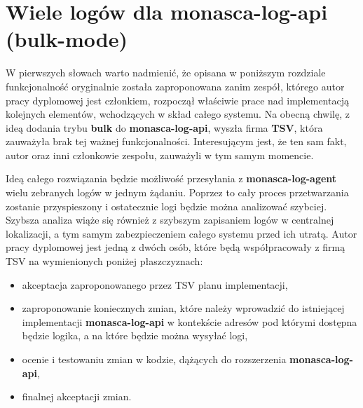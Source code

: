 \section{Wiele logów dla monasca-log-api (bulk-mode)}
\label{chapter:application_own:plans:bulk_monasca_log_api}

W pierwszych słowach warto nadmienić, że opisana w poniższym rozdziale funkcjonalność oryginalnie została 
zaproponowana zanim zespół, którego autor pracy dyplomowej jest członkiem, rozpoczął właściwie prace
nad implementacją kolejnych elementów, wchodzących w skład całego systemu. Na obecną chwilę, z ideą 
dodania trybu \textbf{bulk} do \textbf{monasca-log-api}, wyszła firma \textbf{TSV}, która zauważyła brak tej
ważnej funkcjonalności. Interesującym jest, że ten sam fakt, autor oraz inni członkowie zespołu, zauważyli
w tym samym momencie. 

Ideą całego rozwiązania będzie możliwość przesyłania z \textbf{monasca-log-agent} wielu zebranych logów
w jednym żądaniu. Poprzez to cały proces przetwarzania zostanie przyspieszony i ostatecznie logi
będzie można analizować szybciej. Szybsza analiza wiąże się również z szybszym zapisaniem logów w centralnej lokalizacji,
a tym samym zabezpieczeniem całego systemu przed ich utratą. Autor pracy dyplomowej jest jedną z dwóch osób, które będą
współpracowały z firmą TSV na wymienionych poniżej płaszczyznach:
\begin{itemize}
    \item akceptacja zaproponowanego przez TSV planu implementacji,
    \item zaproponowanie koniecznych zmian, które należy wprowadzić do istniejącej implementacji \textbf{monasca-log-api}
    w kontekście adresów pod którymi dostępna będzie logika, a na które będzie można wysyłać logi,
    \item ocenie i testowaniu zmian w kodzie, dążących do rozszerzenia \textbf{monasca-log-api},
    \item finalnej akceptacji zmian.
\end{itemize}